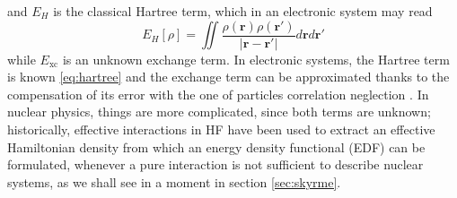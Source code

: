 and $E_H$ is the classical Hartree term, which in an electronic system may read
\begin{equation}
    \label{eq:elec}
    E_H[\rho] = \iint \frac{\rho(\bm r)\rho(\bm r')}{|\bm r-\bm r'|} d\bm r d\bm r'
\end{equation}
while $E_\text{xc}$ is an unknown exchange term. In electronic systems, the Hartree term is known \eqref{eq:hartree} and the exchange term can be approximated thanks to the compensation of its error with the one of particles correlation neglection \cite{Martin2004}. In nuclear physics, things are more complicated, since both terms are unknown; historically, effective interactions in HF have been used to extract an effective Hamiltonian density from which an energy density functional (EDF) can be formulated, whenever a pure interaction is not sufficient to describe nuclear systems, as we shall see in a moment in section \ref{sec:skyrme}.